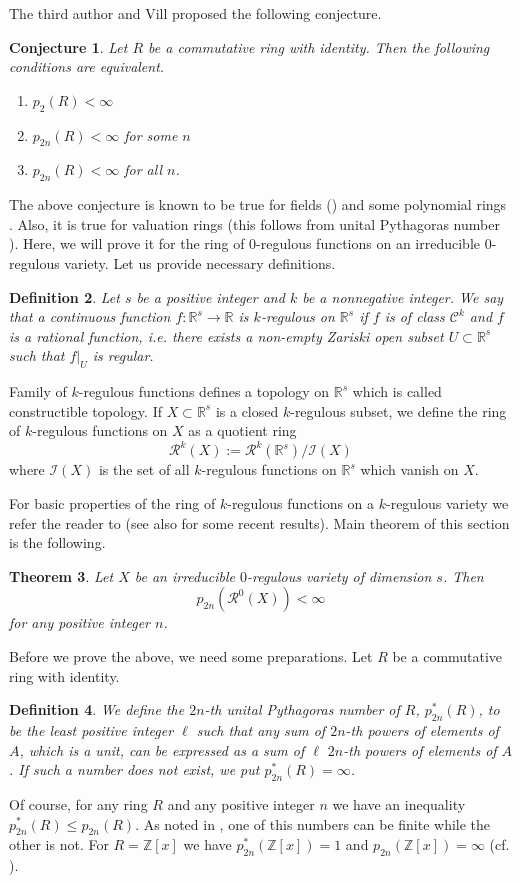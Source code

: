 \documentclass[12pt,reqno]{amsart}   	%
\newtheorem{thm}{Theorem}[section]
\newtheorem{df}[thm]{Definition}
\newtheorem{conj}[thm]{Conjecture}
\theoremstyle{remark}
\newcommand{\RR}{\mathcal{R}}
\newcommand{\Z}{\mathbb{Z}}
\newcommand{\R}{\mathbb{R}}
\begin{document}
The third author and Vill proposed the following conjecture.
\begin{conj}\cite[Conjecture 5.2]{kv2023}
Let $R$ be a commutative ring with identity. Then the following conditions are equivalent.
\begin{enumerate}
\item $p_2(R)<\infty$
\item $p_{2n}(R) <\infty$ for some $n$
\item $p_{2n}(R) <\infty$ for all $n$.
\end{enumerate}
\end{conj}

The above conjecture is known to be true for fields (\cite{becker1982}) and some polynomial rings \cite{bk2024, kv2023}. Also, it is true for valuation rings (this follows from unital Pythagoras number \cite[Theorem 5.17]{bp1996}). Here, we will prove it for the ring of $0$-regulous functions on an irreducible $0$-regulous variety.  Let us provide necessary definitions.
\begin{df}
Let $s$ be a positive integer and $k$ be a nonnegative integer. We say that a continuous function $f: \R^s \rightarrow \R$ is $k$-regulous on $\R^s$ if $f$ is of class $\mathcal{C}^k$ and $f$ is a rational function, i.e. there exists a non-empty Zariski open subset $U\subset \R^s$ such that $f|_U$ is regular.
\end{df}
Family of $k$-regulous functions defines a topology on $\R^s$ which is called constructible topology. If $X\subset \R^s$ is a closed $k$-regulous subset, we define the ring of $k$-regulous functions on $X$ as a quotient ring 
$$\RR^k(X):=\RR^k(\R^s)/\mathcal{I}(X)$$
where $\mathcal{I}(X)$ is the set of all $k$-regulous functions on $\R^s$ which vanish on $X$.


For basic properties of the ring of $k$-regulous functions on a $k$-regulous variety we refer the reader to \cite{bk2023, fhmm2016} (see also \cite{banecki2024, banecki2025} for some recent results). Main theorem of this section is the following.
\begin{thm}
    Let $X$ be an irreducible $0$-regulous variety of dimension $s$. Then 
    $$ p_{2n}(\RR^0(X)) < \infty $$
    for any positive integer $n$.
\end{thm}
Before we prove the above, we need some preparations. Let $R$ be a commutative ring with identity. 

\begin{df}
We define the $2n$-th unital Pythagoras number of $R$,  $p^*_{2n}(R)$, to be the least positive integer $\ell$ such that any sum of $2n$-th powers of elements of $A$, which is a unit, can be expressed as a sum of $\ell$ $2n$-th powers of elements of $A$. If such a number does not exist, we put $p^*_{2n}(R)=\infty$.
\end{df}
Of course, for any ring $R$ and any positive integer $n$  we have an inequality $p^*_{2n}(R) \leq p_{2n}(R)$. As noted in \cite{bp1996}, one of this numbers can be finite while the other is not. For $R=\Z[x]$ we have $p^*_{2n}(\Z[x])=1$ and $p_{2n}(\Z[x])=\infty$ (cf. \cite{cldr1982}).
\end{document}
